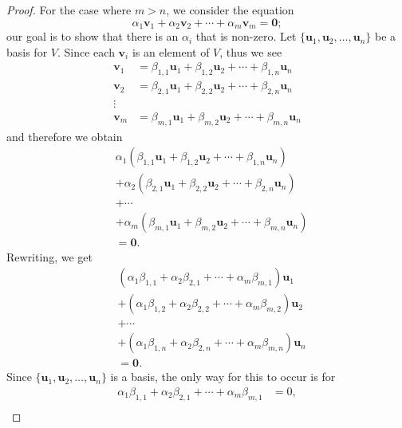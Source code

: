 \begin{proof}
    For the case where $m > n$, we consider the equation
    \[
        \alpha_1\mathbf{v}_1 + \alpha_2\mathbf{v}_2 + \cdots + \alpha_m\mathbf{v}_m = \mathbf{0};
    \]
    our goal is to show that there is an $\alpha_i$ that is non-zero. Let $\{\mathbf{u}_1, \mathbf{u}_2, \dots, \mathbf{u}_n\}$ be a basis for $V$. Since each $\mathbf{v}_i$ is an element of $V$, thus we see
    \begin{align*}
        \mathbf{v}_1 &= \beta_{1,1}\mathbf{u}_1 + \beta_{1,2}\mathbf{u}_2 + \cdots + \beta_{1,n}\mathbf{u}_n\\
        \mathbf{v}_2 &= \beta_{2,1}\mathbf{u}_1 + \beta_{2,2}\mathbf{u}_2 + \cdots + \beta_{2,n}\mathbf{u}_n\\
        \vdots\\
        \mathbf{v}_m &= \beta_{m,1}\mathbf{u}_1 + \beta_{m,2}\mathbf{u}_2 + \cdots + \beta_{m,n}\mathbf{u}_n
    \end{align*}
    and therefore we obtain
    \begin{align*}
        &\alpha_1\left(\beta_{1,1}\mathbf{u}_1 + \beta_{1,2}\mathbf{u}_2 + \cdots + \beta_{1,n}\mathbf{u}_n\right)\\
        &+ \alpha_2\left(\beta_{2,1}\mathbf{u}_1 + \beta_{2,2}\mathbf{u}_2 + \cdots + \beta_{2,n}\mathbf{u}_n\right)\\
        &+ \cdots \\
        &+ \alpha_m\left(\beta_{m,1}\mathbf{u}_1 + \beta_{m,2}\mathbf{u}_2 + \cdots + \beta_{m,n}\mathbf{u}_n\right)\\
        &= \mathbf{0}.
    \end{align*}
    Rewriting, we get
    \begin{align*}
        &\left(\alpha_1\beta_{1,1} + \alpha_2\beta_{2,1} + \cdots + \alpha_m\beta_{m,1}\right)\mathbf{u}_1\\
        &+ \left(\alpha_1\beta_{1,2} + \alpha_2\beta_{2,2} + \cdots + \alpha_m\beta_{m,2}\right)\mathbf{u}_2\\
        &+ \cdots\\
        &+ \left(\alpha_1\beta_{1,n} + \alpha_2\beta_{2,n} + \cdots + \alpha_m\beta_{m,n}\right)\mathbf{u}_n\\
        &= \mathbf{0}.
    \end{align*}
    Since $\{\mathbf{u}_1, \mathbf{u}_2, \dots, \mathbf{u}_n\}$ is a basis, the only way for this to occur is for
    \begin{align*}
        \alpha_1\beta_{1,1} + \alpha_2\beta_{2,1} + \cdots + \alpha_m\beta_{m,1} &= 0,\\

\end{align*}
\end{proof}
